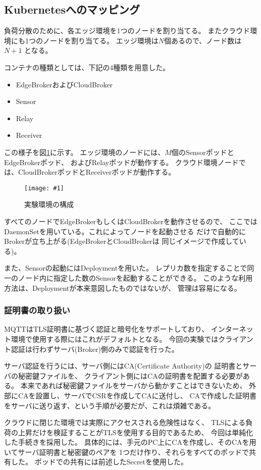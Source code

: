 \documentclass[submit,techrep]{ipsj}
\newcommand{\reffig}[1]{図\ref{#1}}
\newcommand{\epsfig}[4]{
\begin{figure}[tb]
  \begin{center}
    \texttt{[image: \#1]}
  \end{center}
  \caption{#3}
  \label{#4}
\end{figure}}
\newcommand{\kbs}{Kubernetes}
\begin{document}
\subsection{\kbs へのマッピング}

負荷分散のために、各エッジ環境を1つのノードを割り当てる。
またクラウド環境にも1つのノードを割り当てる。
エッジ環境は$N$個あるので、ノード数は $N+1$ となる。

コンテナの種類としては、下記の4種類を用意した。
\begin{itemize}
  \item EdgeBrokerおよびCloudBroker
  \item Sensor 
  \item Relay
  \item Receiver
\end{itemize}

この様子を\reffig{setup}に示す。
エッジ環境のノードには、$M$個のSensorポッドとEdgeBrokerポッド、
およびRelayポッドが動作する。
クラウド環境ノードでは、CloudBrokerポッドとReceiverポッドが動作する。

\epsfig{figs/experimental-setup.pdf}{width=8.5cm}{実験環境の構成}{setup}

すべてのノードでEdgeBrokerもしくはCloudBrokerを動作させるので、
ここではDaemonSetを用いている。これによってノードを起動させる
だけで自動的にBrokerが立ち上がる(EdgeBrokerとCloudBrokerは
同じイメージで作成している)。

また、Sensorの起動にはDeploymentを用いた。
レプリカ数を指定することで同一のノード内に指定した数のSensorを起動することができる。
このような利用方法は、Deploymentが本来意図したものではないが、
管理は容易になる。


\subsubsection{証明書の取り扱い}
MQTTはTLS証明書に基づく認証と暗号化をサポートしており、
インターネット環境で使用する際にはこれがデフォルトとなる。
今回の実験ではクライアント認証は行わずサーバ(Broker)側のみで認証を行った。

サーバ認証を行うには、サーバ側にはCA(Certificate Authority)の
証明書とサーバの秘密鍵ファイルを、
クライアント側にはCAの証明書を配置する必要がある。
本来であれば秘密鍵ファイルをサーバから動かすことはできないため、
外部にCAを設置し、サーバでCSRを作成してCAに送付し、
CAで作成した証明書をサーバに送り返す、という手順が必要だが、これは煩雑である。

クラウドに閉じた環境では実際にアクセスされる危険性はなく、
TLSによる負荷の上昇だけを検証することがTLSを使用する目的であるため、
今回は単純化した手続きを採用した。
具体的には、手元のPC上にCAを作成し、そのCAを用いてサーバ証明書と秘密鍵のペアを
1つだけ作り、それらをすべてのポッドで共有した。
ポッドでの共有には前述したSecretを使用した。
\end{document}
